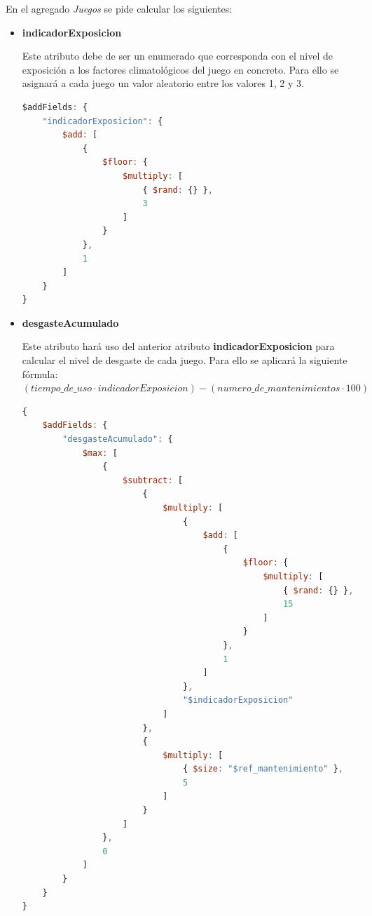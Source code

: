 \documentclass[]{article}
\begin{document}
En el agregado \textit{Juegos} se pide calcular los siguientes:
\begin{itemize}
    \item \textbf{indicadorExposicion}
    
    Este atributo debe de ser un enumerado que corresponda con el nivel de exposición a los factores climatológicos del juego en concreto. Para ello se asignará a cada juego un valor aleatorio entre los valores 1, 2 y 3.
    \begin{lstlisting}[caption=Cálculo de indicadorExposicion, language=JavaScript]
$addFields: {
    "indicadorExposicion": {
        $add: [
            {
                $floor: {
                    $multiply: [
                        { $rand: {} },
                        3
                    ]
                }
            },
            1
        ]
    }
}
    \end{lstlisting}

    \item \textbf{desgasteAcumulado}
    
    Este atributo hará uso del anterior atributo \textbf{indicadorExposicion} para calcular el nivel de desgaste de cada juego. Para ello se aplicará la siguiente fórmula: $( tiempo\_de\_uso \cdot indicadorExposicion) - (numero\_de\_mantenimientos \cdot 100)$

    \begin{lstlisting}[caption=Cálculo de desgasteAcumulado, language=JavaScript]
{
    $addFields: {
        "desgasteAcumulado": {
            $max: [
                {
                    $subtract: [
                        {
                            $multiply: [
                                {
                                    $add: [
                                        {
                                            $floor: {
                                                $multiply: [
                                                    { $rand: {} },
                                                    15
                                                ]
                                            }
                                        },
                                        1
                                    ]
                                },
                                "$indicadorExposicion"
                            ]
                        },
                        {
                            $multiply: [
                                { $size: "$ref_mantenimiento" },
                                5
                            ]
                        }
                    ]
                },
                0
            ]
        }
    }
}
    \end{lstlisting}


\end{itemize}
\end{document}
